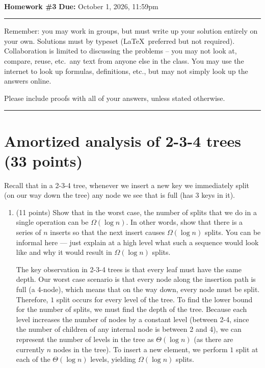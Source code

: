 \documentclass[11pt]{article}
\begin{document}
\\
{{\bf Homework \#3}} \hfill {{\bf Due:} October 1, 2026, 11:59pm} \\
\rule[0.1in]{\textwidth}{0.4pt}

Remember: you may work in groups, but must write up your solution entirely on your own.  Solutions must by typeset (\LaTeX\ preferred but not required). 
Collaboration is limited to discussing the problems -- you may not look at, compare, reuse, etc.~any text from anyone else in the class. 
You may use the internet to look up formulas, definitions, etc., but may not simply look up the answers online.  

Please include proofs with all of your answers, unless stated otherwise.

\noindent \rule[0.1in]{\textwidth}{0.4pt}

\section{Amortized analysis of 2-3-4 trees (33 points)}

Recall that in a 2-3-4 tree, whenever we insert a new key we immediately split (on our way down the tree) any node we see that is full (has 3 keys in it).  

\begin{enumerate}
\item (11 points) Show that in the worst case, the number of splits that we do in a single operation can be $\Omega(\log n)$. 
In other words, show that there is a series of $n$ inserts so that the next insert causes $\Omega(\log n)$ splits. 
You can be informal here --- just explain at a high level what such a sequence would look like and why it would result in $\Omega(\log n)$ splits.

The key observation in 2-3-4 trees is that every leaf must have the same depth. 
Our worst case scenario is that every node along the insertion path is full (a 4-node), which means that on the way down, every node must be split. 
Therefore, $1$ split occurs for every level of the tree. To find the lower bound for the number of splits, we must find the depth of the tree. 
Because each level increases the number of nodes by a constant level (between 2-4, since the number of children of any internal node is between 2 and 4), 
we can represent the number of levels in the tree as $\Theta(\log n)$ (as there are currently $n$ nodes in the tree). 
To insert a new element, we perform $1$ split at each of the $\Theta(\log n)$ levels, yielding $\Omega(\log n)$ splits.

\end{enumerate}
\end{document}
